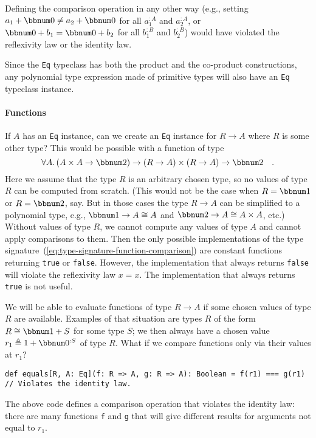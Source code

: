 Defining the comparison operation in any other way (e.g., setting
$a_{1}+\bbnum 0\neq a_{2}+\bbnum 0$ for all $a_{1}^{:A}$ and $a_{2}^{:A}$,
or $\bbnum 0+b_{1}=\bbnum 0+b_{2}$ for all $b_{1}^{:B}$ and $b_{2}^{:B}$)
would have violated the reflexivity law or
the identity law.

Since the \lstinline!Eq! typeclass has both the product and the co-product
constructions, any polynomial type expression made of primitive types
will also have an \lstinline!Eq! typeclass instance.

\paragraph{Functions}

If $A$ has an \lstinline!Eq! instance, can we create an \lstinline!Eq!
instance for $R\rightarrow A$ where $R$ is some other type? This
would be possible with a function of type
\begin{equation}
\forall A.\,(A\times A\rightarrow\bbnum 2)\rightarrow\left(R\rightarrow A\right)\times\left(R\rightarrow A\right)\rightarrow\bbnum 2\quad.\label{eq:type-signature-function-comparison}
\end{equation}
Here we assume that the type $R$ is an arbitrary chosen type, so
no values of type $R$ can be computed from scratch. (This would not
be the case when $R=\bbnum 1$ or $R=\bbnum 2$, say. But in those
cases the type $R\rightarrow A$ can be simplified to a polynomial
type, e.g., $\bbnum 1\rightarrow A\cong A$ and $\bbnum 2\rightarrow A\cong A\times A$,
etc.) Without values of type $R$, we cannot compute any values of
type $A$ and cannot apply comparisons to them. Then the only possible
implementations of the type signature~(\ref{eq:type-signature-function-comparison})
are constant functions returning \lstinline!true! or \lstinline!false!.
However, the implementation that always returns \lstinline!false!
will violate the reflexivity law $x=x$. The implementation that always
returns \lstinline!true! is not useful.

We will be able to evaluate functions of type $R\rightarrow A$ if
some chosen values of type $R$ are available. Examples of that situation
are types $R$ of the form $R\cong\bbnum 1+S$ for some type $S$;
we then always have a chosen value $r_{1}\triangleq1+\bbnum 0^{:S}$
of type $R$. What if we compare functions only via their values at
$r_{1}$?
\begin{lstlisting}
def equals[R, A: Eq](f: R => A, g: R => A): Boolean = f(r1) === g(r1)  // Violates the identity law.
\end{lstlisting}
The above code defines a comparison operation that violates the identity
law: there are many functions \lstinline!f! and \lstinline!g! that
will give different results for arguments not equal to $r_{1}$. 

